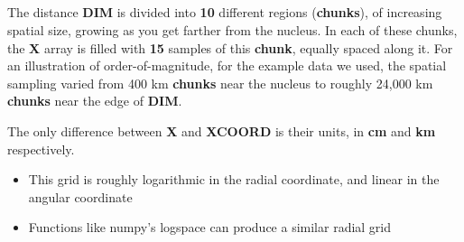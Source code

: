\documentclass[11pt]{article}
\newcommand{\problempart}[1]{\subsection*{\contour{mybblack}{\textcolor{myblack}{#1}}}}
\newcommand{\fortranvar}[1]{\textcolor{myblue}{\textbf{#1}}}
\newcommand{\magicnumber}[1]{\textcolor{myred}{\textbf{#1}}}
\begin{document}
\problempart{XCOORD and X arrays}
The distance \fortranvar{DIM} is divided into \magicnumber{10} different regions (\textbf{chunks}), of increasing spatial size, growing as you get farther from the nucleus.
In each of these chunks, the \fortranvar{X} array is filled with \magicnumber{15} samples of this \textbf{chunk}, equally spaced along it.
For an illustration of order-of-magnitude, for the example data we used, the spatial sampling varied from 400 km \textbf{chunks} near the nucleus to roughly 24,000 km \textbf{chunks} near the edge of \fortranvar{DIM}.

The only difference between \fortranvar{X} and \fortranvar{XCOORD} is their units, in \textbf{cm} and \textbf{km} respectively.

\begin{itemize}
    \item This grid is roughly logarithmic in the radial coordinate, and linear in the angular coordinate
    \item Functions like numpy's logspace can produce a similar radial grid
\end{itemize}

\end{document}
